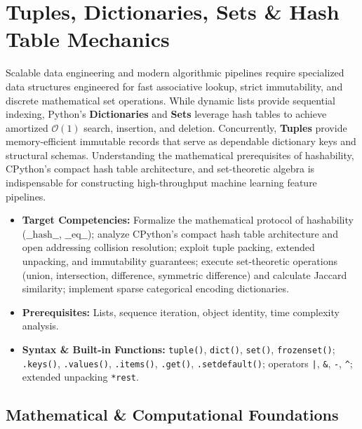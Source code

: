 \chapter{Tuples, Dictionaries, Sets \& Hash Table Mechanics}

Scalable data engineering and modern algorithmic pipelines require specialized data structures engineered for fast associative lookup, strict immutability, and discrete mathematical set operations. While dynamic lists provide sequential indexing, Python's \textbf{Dictionaries} and \textbf{Sets} leverage hash tables to achieve amortized $\mathcal{O}(1)$ search, insertion, and deletion. Concurrently, \textbf{Tuples} provide memory-efficient immutable records that serve as dependable dictionary keys and structural schemas. Understanding the mathematical prerequisites of hashability, CPython's compact hash table architecture, and set-theoretic algebra is indispensable for constructing high-throughput machine learning feature pipelines.

\vspace{0.5cm}
\begin{tcolorbox}[colback=primarylight, colframe=primarydark, title={\textbf{Executive Roadmap \& Learning Objectives}}]
\begin{itemize}
    \item \textbf{Target Competencies:} Formalize the mathematical protocol of hashability ($\_\_\text{hash}\_\_$, $\_\_\text{eq}\_\_$); analyze CPython's compact hash table architecture and open addressing collision resolution; exploit tuple packing, extended unpacking, and immutability guarantees; execute set-theoretic operations (union, intersection, difference, symmetric difference) and calculate Jaccard similarity; implement sparse categorical encoding dictionaries.
    \item \textbf{Prerequisites:} Lists, sequence iteration, object identity, time complexity analysis.
    \item \textbf{Syntax \& Built-in Functions:} \texttt{tuple()}, \texttt{dict()}, \texttt{set()}, \texttt{frozenset()}; \texttt{.keys()}, \texttt{.values()}, \texttt{.items()}, \texttt{.get()}, \texttt{.setdefault()}; operators \texttt{|}, \texttt{\&}, \texttt{-}, \texttt{\^{}}; extended unpacking \texttt{*rest}.
\end{itemize}
\end{tcolorbox}

\section{Mathematical \& Computational Foundations}

